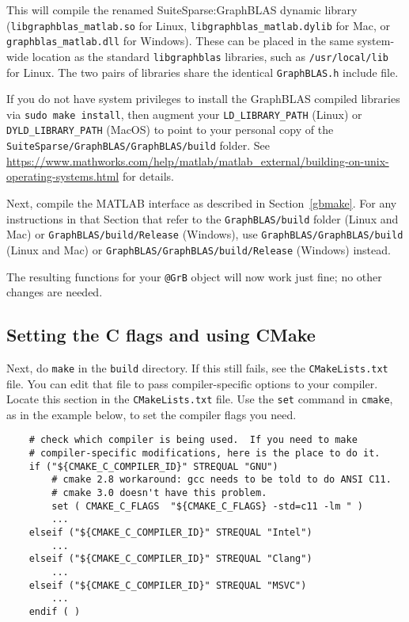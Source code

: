 \documentclass[12pt]{article}
\begin{document}
This will compile the renamed SuiteSparse:GraphBLAS dynamic library
(\verb'libgraphblas_matlab.so' for Linux, \verb'libgraphblas_matlab.dylib'
for Mac, or \verb'graphblas_matlab.dll' for Windows).  These can be
placed in the same system-wide location as the standard \verb'libgraphblas'
libraries, such as \verb'/usr/local/lib' for Linux.  The two pairs of
libraries share the identical \verb'GraphBLAS.h' include file.

If you do not have system privileges to install the GraphBLAS compiled
libraries via \verb'sudo make install', then augment your
\verb'LD_LIBRARY_PATH' (Linux) or \verb'DYLD_LIBRARY_PATH' (MacOS) to point to
your personal copy of the \newline
\verb'SuiteSparse/GraphBLAS/GraphBLAS/build' folder.  See \newline
\url{https://www.mathworks.com/help/matlab/matlab_external/building-on-unix-operating-systems.html}
for details.

Next, compile the MATLAB interface as described in Section~\ref{gbmake}.  For
any instructions in that Section that refer to the \verb'GraphBLAS/build'
folder (Linux and Mac) or \verb'GraphBLAS/build/Release' (Windows), use \newline
\verb'GraphBLAS/GraphBLAS/build' (Linux and Mac) or \newline
\verb'GraphBLAS/GraphBLAS/build/Release' (Windows) instead.

The resulting functions for your \verb'@GrB' object will now work just fine;
no other changes are needed.

\subsection{Setting the C flags and using CMake}

Next, do \verb'make' in the \verb'build' directory.  If this still fails, see
the \verb'CMakeLists.txt' file.  You can edit that file to pass
compiler-specific options to your compiler.  Locate this section in the
\verb'CMakeLists.txt' file.  Use the \verb'set' command in \verb'cmake', as in
the example below, to set the compiler flags you need.

    {\small
    \begin{verbatim}
    # check which compiler is being used.  If you need to make
    # compiler-specific modifications, here is the place to do it.
    if ("${CMAKE_C_COMPILER_ID}" STREQUAL "GNU")
        # cmake 2.8 workaround: gcc needs to be told to do ANSI C11.
        # cmake 3.0 doesn't have this problem.
        set ( CMAKE_C_FLAGS  "${CMAKE_C_FLAGS} -std=c11 -lm " )
        ...
    elseif ("${CMAKE_C_COMPILER_ID}" STREQUAL "Intel")
        ...
    elseif ("${CMAKE_C_COMPILER_ID}" STREQUAL "Clang")
        ...
    elseif ("${CMAKE_C_COMPILER_ID}" STREQUAL "MSVC")
        ...
    endif ( )
    \end{verbatim} }
\end{document}
